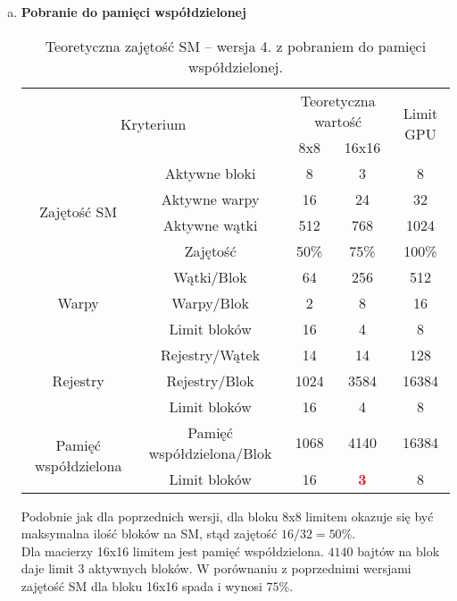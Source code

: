 \begin{enumerate}[(a)]
\item \textbf{Pobranie do pamięci współdzielonej} \newline

\begin{center}
\begin{table}[H]
\centering
\begin{tabular}{|c|c|c|c|c|}
\hline
\multicolumn{2}{|c|}{\multirow{2}{*}{Kryterium}} & \multicolumn{2}{c|}{Teoretyczna wartość} & \multirow{2}{*}{Limit GPU} \\ \cline{3-4}
\multicolumn{2}{|c|}{} & 8x8 & 16x16 & \\ \hline
\multirow{4}{*}{Zajętość SM} & Aktywne bloki & 8 & 3 & 8 \\ \cline{2-5}
& Aktywne warpy & 16 & 24 & 32 \\ \cline{2-5}
& Aktywne wątki & 512 & 768 & 1024 \\ \cline{2-5}
& Zajętość & 50\% & 75\% & 100\% \\ \hline
\multirow{3}{*}{Warpy} & Wątki/Blok & 64 & 256 & 512 \\ \cline{2-5}
& Warpy/Blok & 2 & 8 & 16 \\ \cline{2-5}
& Limit bloków & 16 & 4 & 8 \\ \hline
\multirow{3}{*}{Rejestry} & Rejestry/Wątek & 14 & 14 & 128 \\ \cline{2-5}
& Rejestry/Blok & 1024 & 3584 & 16384 \\ \cline{2-5}
& Limit bloków & 16 & 4 & 8 \\ \hline
\multirow{2}{*}{Pamięć współdzielona} & Pamięć współdzielona/Blok & 1068 & 4140 & 16384 \\ \cline{2-5}
& Limit bloków & 16 & \textcolor{red}{\textbf{3}} & 8 \\ \hline
\end{tabular}
\caption{Teoretyczna zajętość SM -- wersja 4. z pobraniem do pamięci współdzielonej.}
\end{table}
\end{center}

Podobnie jak dla poprzednich wersji, dla bloku 8x8 limitem okazuje się być maksymalna ilość bloków na SM, stąd zajętość $ 16 / 32 = 50\% $. \\
Dla macierzy 16x16 limitem jest pamięć współdzielona. $4140$ bajtów na blok daje limit $3$ aktywnych bloków. W porównaniu z poprzednimi wersjami zajętość SM dla bloku 16x16 spada i wynosi $ 75\% $. \\

\end{enumerate}

